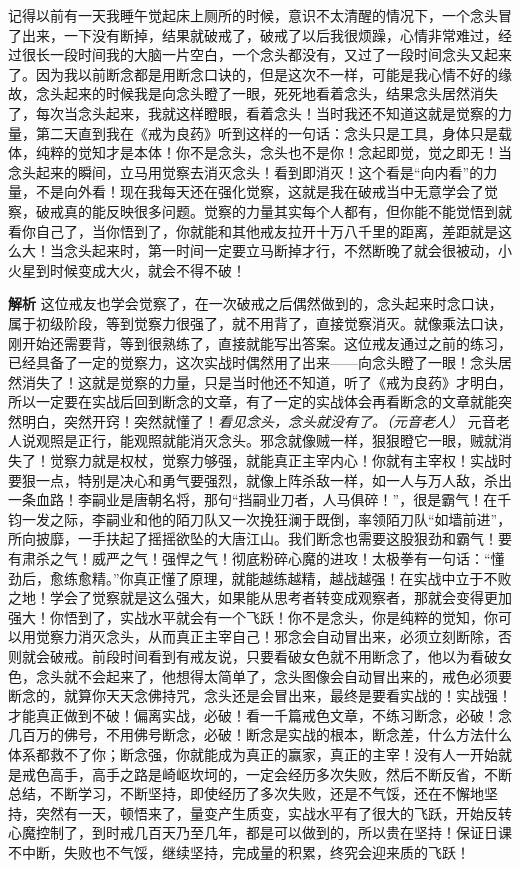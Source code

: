 \begin{case}
    记得以前有一天我睡午觉起床上厕所的时候，意识不太清醒的情况下，一个念头冒了出来，一下没有断掉，结果就破戒了，破戒了以后我很烦躁，心情非常难过，经过很长一段时间我的大脑一片空白，一个念头都没有，又过了一段时间念头又起来了。因为我以前断念都是用断念口诀的，但是这次不一样，可能是我心情不好的缘故，念头起来的时候我是向念头瞪了一眼，死死地看着念头，结果念头居然消失了，每次当念头起来，我就这样瞪眼，看着念头！当时我还不知道这就是觉察的力量，第二天直到我在《戒为良药》听到这样的一句话：念头只是工具，身体只是载体，纯粹的觉知才是本体！你不是念头，念头也不是你！念起即觉，觉之即无！当念头起来的瞬间，立马用觉察去消灭念头！看到即消灭！这个看是“向内看”的力量，不是向外看！现在我每天还在强化觉察，这就是我在破戒当中无意学会了觉察，破戒真的能反映很多问题。觉察的力量其实每个人都有，但你能不能觉悟到就看你自己了，当你悟到了，你就能和其他戒友拉开十万八千里的距离，差距就是这么大！当念头起来时，第一时间一定要立马断掉才行，不然断晚了就会很被动，小火星到时候变成大火，就会不得不破！

    \textbf{解析} 这位戒友也学会觉察了，在一次破戒之后偶然做到的，念头起来时念口诀，属于初级阶段，等到觉察力很强了，就不用背了，直接觉察消灭。就像乘法口诀，刚开始还需要背，等到很熟练了，直接就能写出答案。这位戒友通过之前的练习，已经具备了一定的觉察力，这次实战时偶然用了出来——向念头瞪了一眼！念头居然消失了！这就是觉察的力量，只是当时他还不知道，听了《戒为良药》才明白，所以一定要在实战后回到断念的文章，有了一定的实战体会再看断念的文章就能突然明白，突然开窍！突然就懂了！\textit{看见念头，念头就没有了。（元音老人）} 元音老人说观照是正行，能观照就能消灭念头。邪念就像贼一样，狠狠瞪它一眼，贼就消失了！觉察力就是权杖，觉察力够强，就能真正主宰内心！你就有主宰权！实战时要狠一点，特别是决心和勇气要强烈，就像上阵杀敌一样，如一人与万人敌，杀出一条血路！李嗣业是唐朝名将，那句“挡嗣业刀者，人马俱碎！”，很是霸气！在千钧一发之际，李嗣业和他的陌刀队又一次挽狂澜于既倒，率领陌刀队“如墙前进”，所向披靡，一手扶起了摇摇欲坠的大唐江山。我们断念也需要这股狠劲和霸气！要有肃杀之气！威严之气！强悍之气！彻底粉碎心魔的进攻！太极拳有一句话：“懂劲后，愈练愈精。”你真正懂了原理，就能越练越精，越战越强！在实战中立于不败之地！学会了觉察就是这么强大，如果能从思考者转变成观察者，那就会变得更加强大！你悟到了，实战水平就会有一个飞跃！你不是念头，你是纯粹的觉知，你可以用觉察力消灭念头，从而真正主宰自己！邪念会自动冒出来，必须立刻断除，否则就会破戒。前段时间看到有戒友说，只要看破女色就不用断念了，他以为看破女色，念头就不会起来了，他想得太简单了，念头图像会自动冒出来的，戒色必须要断念的，就算你天天念佛持咒，念头还是会冒出来，最终是要看实战的！实战强！才能真正做到不破！偏离实战，必破！看一千篇戒色文章，不练习断念，必破！念几百万的佛号，不用佛号断念，必破！断念是实战的根本，断念差，什么方法什么体系都救不了你；断念强，你就能成为真正的赢家，真正的主宰！没有人一开始就是戒色高手，高手之路是崎岖坎坷的，一定会经历多次失败，然后不断反省，不断总结，不断学习，不断坚持，即使经历了多次失败，还是不气馁，还在不懈地坚持，突然有一天，顿悟来了，量变产生质变，实战水平有了很大的飞跃，开始反转心魔控制了，到时戒几百天乃至几年，都是可以做到的，所以贵在坚持！保证日课不中断，失败也不气馁，继续坚持，完成量的积累，终究会迎来质的飞跃！
\end{case}

